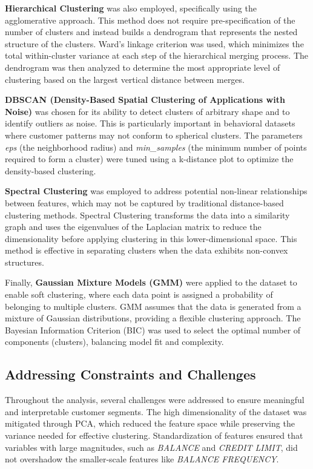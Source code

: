 \documentclass[runningheads,a4paper]{llncs}
\begin{document}
\textbf{Hierarchical Clustering} was also employed, specifically using the agglomerative approach. This method does not require pre-specification of the number of clusters and instead builds a dendrogram that represents the nested structure of the clusters. Ward’s linkage criterion was used, which minimizes the total within-cluster variance at each step of the hierarchical merging process. The dendrogram was then analyzed to determine the most appropriate level of clustering based on the largest vertical distance between merges.

\textbf{DBSCAN (Density-Based Spatial Clustering of Applications with Noise)} was chosen for its ability to detect clusters of arbitrary shape and to identify outliers as noise. This is particularly important in behavioral datasets where customer patterns may not conform to spherical clusters. The parameters \textit{eps} (the neighborhood radius) and \textit{min\_samples} (the minimum number of points required to form a cluster) were tuned using a k-distance plot to optimize the density-based clustering.

\textbf{Spectral Clustering} was employed to address potential non-linear relationships between features, which may not be captured by traditional distance-based clustering methods. Spectral Clustering transforms the data into a similarity graph and uses the eigenvalues of the Laplacian matrix to reduce the dimensionality before applying clustering in this lower-dimensional space. This method is effective in separating clusters when the data exhibits non-convex structures.

Finally, \textbf{Gaussian Mixture Models (GMM)} were applied to the dataset to enable soft clustering, where each data point is assigned a probability of belonging to multiple clusters. GMM assumes that the data is generated from a mixture of Gaussian distributions, providing a flexible clustering approach. The Bayesian Information Criterion (BIC) was used to select the optimal number of components (clusters), balancing model fit and complexity.

\subsection{Addressing Constraints and Challenges}

Throughout the analysis, several challenges were addressed to ensure meaningful and interpretable customer segments. The high dimensionality of the dataset was mitigated through PCA, which reduced the feature space while preserving the variance needed for effective clustering. Standardization of features ensured that variables with large magnitudes, such as \textit{BALANCE} and \textit{CREDIT LIMIT}, did not overshadow the smaller-scale features like \textit{BALANCE FREQUENCY}.
\end{document}
